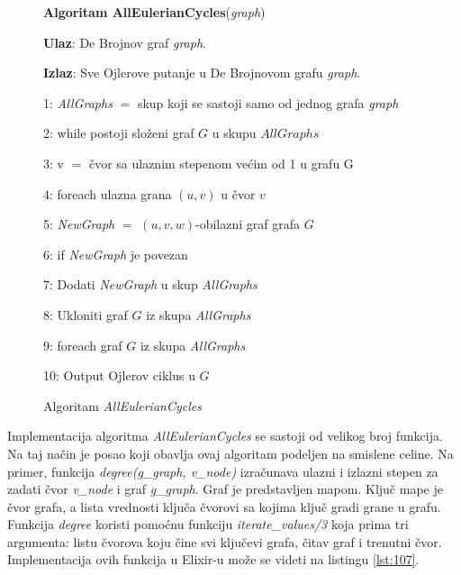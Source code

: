 \documentclass[12pt,oneside]{memoir}
\begin{document}
\begin{figure}[!ht]
\begin{tcolorbox}
\textbf{Algoritam AllEulerianCycles}(\textit{graph})

\textbf{Ulaz}:  De Brojnov graf \textit{graph}.

\textbf{Izlaz}: Sve Ojlerove putanje u De Brojnovom grafu \textit{graph}.

1: \textit{AllGraphs} $=$ skup koji se sastoji samo od jednog grafa \textit{graph}

2: while postoji složeni graf $G$ u skupu $AllGraphs$

3:\hspace{1cm} v $=$ čvor sa ulaznim stepenom većim od 1 u grafu G

4:\hspace{1cm} foreach ulazna grana $(u, v)$ u čvor $v$
    
5:\hspace{2cm} \textit{NewGraph} $=$ $(u, v, w)$-obilazni graf grafa $G$

6:\hspace{2cm} if \textit{NewGraph} je povezan

7:\hspace{3cm} Dodati \textit{NewGraph} u skup \textit{AllGraphs}

8:\hspace{1cm} Ukloniti graf $G$ iz skupa \textit{AllGraphs}

9: foreach graf $G$ iz skupa \textit{AllGraphs}

10:\hspace{1cm} Output Ojlerov ciklus u $G$
\end{tcolorbox}
\caption{Algoritam \textit{AllEulerianCycles} \cite{bioinformaticsAlg}}
\label{box:allEulerianCycles}
\end{figure}

Implementacija algoritma \textit{AllEulerianCycles} se sastoji od velikog broj funkcija. Na taj način je posao koji obavlja ovaj algoritam podeljen na smislene celine. Na primer, funkcija \textit{degree(g\_graph, v\_node)} izračunava ulazni i izlazni stepen za zadati čvor \textit{v\_node} i graf \textit{g\_graph}. Graf je predstavljen mapom. Ključ mape je čvor grafa, a lista vrednosti ključa čvorovi sa kojima ključ gradi grane u grafu. Funkcija \textit{degree} koristi pomoćnu funkciju \textit{iterate\_values/3} koja  prima tri argumenta: listu čvorova koju čine svi ključevi grafa, čitav graf i trenutni čvor. Implementacija ovih funkcija u Elixir-u može se videti na listingu \ref{lst:107}.
\end{document}
